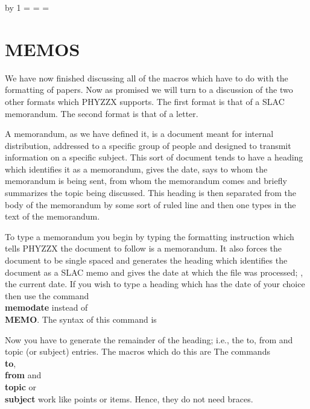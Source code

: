 \advance\lastpage by 1 \pagenumber=\lastpage
\let\chapterlabel=\lastchapterlabel \chapternumber=\lastchap
\sectionnumber=\lastsection
 
\chapter{MEMOS}
 
We have now finished discussing all of the macros which have to
do with the formatting of papers.
Now as promised we will turn to a discussion of the two other
formats which PHYZZX supports.
The first format is that of a SLAC memorandum.
The second format is that of a letter.
 
A memorandum, as we have defined it, is a document meant for internal
distribution, addressed to a specific group of people and
designed to transmit information on a specific subject.
This sort of document tends to have a heading which identifies it
as a memorandum, gives the date, says to whom the memorandum is
being sent, from whom the memorandum comes and briefly summarizes
the topic being discussed.
This heading is then separated from the body of the memorandum
by some sort of ruled line and then one types in the text of
the memorandum.
 
To type a memorandum you begin by typing the formatting instruction
\tc{\\MEMO}
which tells PHYZZX the document to follow is a memorandum.
It also forces the document to be single spaced and generates
the heading which identifies the document as a SLAC memo
and gives the date at which the file was processed; \ie , the current
date.
If you wish to type a heading which has the date of your choice
then use the command {\bf \\memodate} instead of {\bf \\MEMO}.
The syntax of this command is
 
Now you have to generate the remainder of the heading; i.e.,
the to, from and topic (or subject) entries.
The macros which do this are
The commands {\bf \\to}, {\bf \\from} and {\bf \\topic} or
{\bf \\subject} work like points or items.
Hence, they do not need braces.
 
